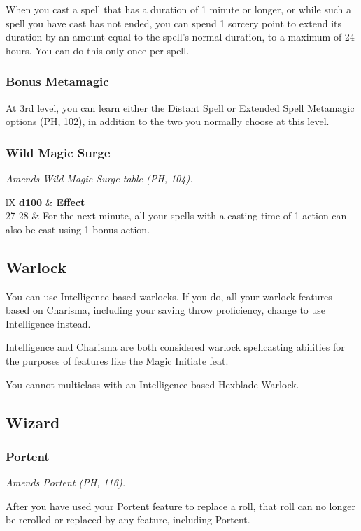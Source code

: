 \documentclass[letterpaper,twocolumn,openany,nodeprecatedcode]{dndbook}
\begin{document}
When you cast a spell that has a duration of 1 minute or longer, or while such a spell you have cast has not ended, you can spend 1 sorcery point to extend its duration by an amount equal to the spell's normal duration, to a maximum of 24 hours. You can do this only once per spell.

\subsubsection{Bonus Metamagic}
At 3rd level, you can learn either the Distant Spell or Extended Spell Metamagic options (PH, 102), in addition to the two you normally choose at this level.

\subsubsection{Wild Magic Surge}
\textit{Amends Wild Magic Surge table (PH, 104).}

\begin{DndTable}[]{lX}
    \textbf{d100} & \textbf{Effect} \\
    27-28 & For the next minute, all your spells with a casting time of 1 action can also be cast using 1 bonus action.
\end{DndTable}

\subsection{Warlock}

You can use Intelligence-based warlocks. If you do, all your warlock features based on Charisma, including your saving throw proficiency, change to use Intelligence instead.

Intelligence and Charisma are both considered warlock spellcasting abilities for the purposes of features like the Magic Initiate feat.

You cannot multiclass with an Intelligence-based Hexblade Warlock.

\subsection{Wizard}

\subsubsection{Portent}
\textit{Amends Portent (PH, 116).}

After you have used your Portent feature to replace a roll, that roll can no longer be rerolled or replaced by any feature, including Portent.
\end{document}

